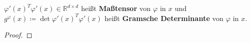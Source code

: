 \begin{definition}
    $\varphi'(x)^T \varphi'(x) \in \mathbb{R}^{d \times d} $
    heißt \textbf{Maßtensor}    von $\varphi$ in $x$ und\\
    $g^\varphi (x) \coloneqq \det \varphi'(x)^T \varphi'(x) $
    heißt \textbf{Gramsche Determinante} von $\varphi$ in $x$.
\end{definition}

\begin{proof}
    
\end{proof}
